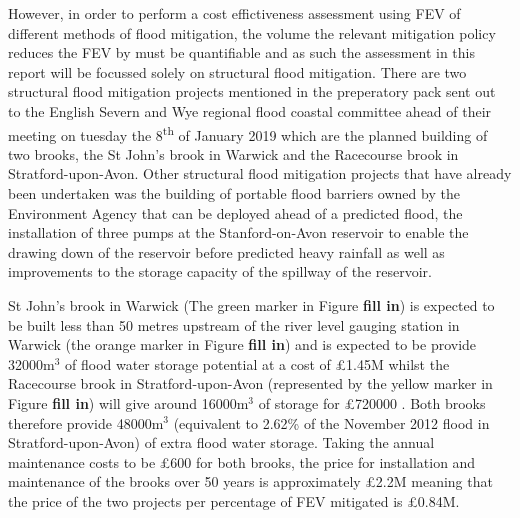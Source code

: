 \documentclass[11pt,a4paper]{article}
\begin{document}
However, in order to perform a cost effictiveness assessment using FEV of different methods of flood mitigation, the volume the relevant mitigation policy reduces the FEV by must be quantifiable and as such the assessment in this report will be focussed solely on structural flood mitigation. There are two structural flood mitigation projects mentioned in the preperatory pack sent out to the English Severn and Wye regional flood coastal committee ahead of their meeting on tuesday the 8\textsuperscript{th} of January 2019 \cite{brook} which are the planned building of two brooks, the St John's brook in Warwick and the Racecourse brook in Stratford-upon-Avon. Other structural flood mitigation projects that have already been undertaken was the building of portable flood barriers owned by the Environment Agency that can be deployed ahead of a predicted flood, the installation of three pumps at the Stanford-on-Avon reservoir to enable the drawing down of the reservoir before predicted heavy rainfall  as well as improvements to the storage capacity of the spillway of the reservoir.

St John's brook in Warwick (The green marker in Figure \textbf{fill in}) is expected to be built less than 50 metres upstream of the river level gauging station in Warwick (the orange marker in Figure \textbf{fill in}) and is expected to be provide 32000m$^3$ of flood water storage potential at a cost of \pounds1.45M whilst the Racecourse brook in Stratford-upon-Avon (represented by the yellow marker in Figure \textbf{fill in}) will give around 16000m$^3$ of storage for \pounds720000 \cite{brook}. Both brooks therefore provide 48000m$^3$ (equivalent to 2.62\% of the November 2012 flood in Stratford-upon-Avon) of extra flood water storage. Taking the annual maintenance costs to be \pounds600 \cite{cost4} for both brooks, the price for installation and maintenance of the brooks over 50 years is approximately \pounds2.2M meaning that the price of the two projects per percentage of FEV mitigated is \pounds0.84M.
\end{document}
